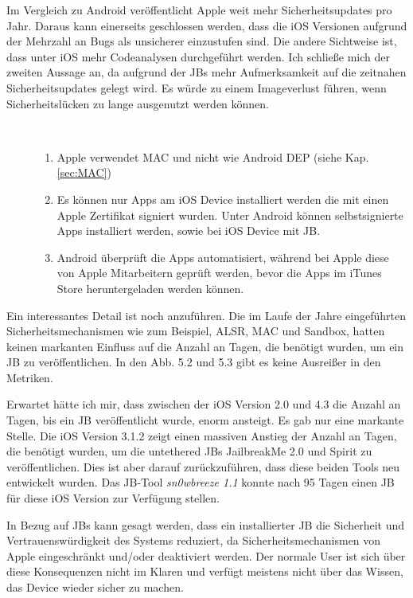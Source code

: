 Im Vergleich zu Android veröffentlicht Apple weit mehr Sicherheitsupdates pro Jahr. Daraus kann einerseits geschlossen werden, dass die iOS Versionen aufgrund der Mehrzahl an Bugs als unsicherer einzustufen sind. Die andere Sichtweise ist, dass unter iOS mehr Codeanalysen durchgeführt werden. Ich schließe mich der zweiten Aussage an, da aufgrund der JBs mehr Aufmerksamkeit auf die zeitnahen Sicherheitsupdates gelegt wird. Es würde zu einem Imageverlust führen, wenn Sicherheitslücken zu lange ausgenutzt werden können. \par
\begin{description}
    \item[\parbox{\textwidth} {Auch in Bezug auf die Sicherheitsmechanismen hat Apple weitere Vorteile gegenüber Android}]~\par
    \begin{enumerate}
        \item Apple verwendet MAC und nicht wie Android DEP (siehe Kap. \ref{sec:MAC})
        \item Es können nur Apps am iOS Device installiert werden die mit einen Apple Zertifikat signiert wurden. Unter Android können selbstsignierte Apps installiert werden, sowie bei iOS Device mit JB.
        \item Android überprüft die Apps automatisiert, während bei Apple diese von Apple Mitarbeitern geprüft werden, bevor die Apps im iTunes Store heruntergeladen werden können.  
    \end{enumerate}
\end{description} 

Ein interessantes Detail ist noch anzuführen. Die im Laufe der Jahre eingeführten Sicherheitsmechanismen wie zum Beispiel, ALSR, MAC und Sandbox, hatten keinen markanten Einfluss auf die Anzahl an Tagen, die benötigt wurden, um ein JB zu veröffentlichen. In den Abb. 5.2 und 5.3 gibt es keine Ausreißer in den Metriken.\par  
Erwartet hätte ich mir, dass zwischen der iOS Version 2.0 und 4.3 die Anzahl an Tagen, bis ein JB veröffentlicht wurde, enorm ansteigt.  Es gab nur eine markante Stelle. Die iOS Version 3.1.2 zeigt einen massiven Anstieg der Anzahl an Tagen, die benötigt wurden, um die untethered JBs JailbreakMe 2.0 und Spirit zu veröffentlichen. Dies ist aber darauf zurückzuführen, dass diese beiden Tools neu entwickelt wurden. Das JB-Tool \textit{\glqq sn0wbreeze 1.1\grqq{}} konnte nach 95 Tagen einen JB für diese iOS Version zur Verfügung stellen.\par
 
In Bezug auf JBs kann gesagt werden, dass ein installierter JB die Sicherheit und Vertrauenswürdigkeit des Systems reduziert, da Sicherheitsmechanismen von Apple eingeschränkt und/oder deaktiviert werden. Der normale User ist sich über diese Konsequenzen nicht im Klaren und verfügt meistens nicht über das Wissen, das Device wieder sicher zu machen.
